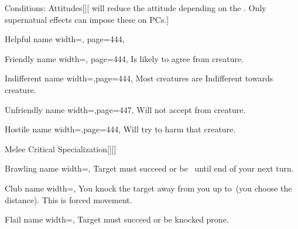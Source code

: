 \begin{PageFront}
\begin{Tables}{\frontTableHeight}
\begin{Table}{Conditions: Attitudes}[][ will reduce the attitude depending on the \GM.
        \quad Only supernatual effects can impose these on PCs.]
\begin{entry}{Helpful}{%
                name width=\conditionLength,%
                page=444,
            }
            \end{entry}
            \begin{entry}{Friendly}{%
                name width=\conditionLength,%
                page=444,
            }
                Is likely to agree  from creature. \hfill
            \end{entry}
            \begin{entry}{Indifferent}{%
                name width=\conditionLength,page=444,}
                Most creatures are Indifferent towards creature.
            \end{entry}
            \begin{entry}{Unfriendly}{%
                name width=\conditionLength,page=447,}
                Will not accept  from creature.
            \end{entry}
            \begin{entry}{Hostile}{%
                name width=\conditionLength,page=444,}
                Will try to harm that creature.
            \end{entry}
        \end{Table}
        \TableSpace
        \begin{Table}{Melee Critical Specialization}[][]
            \begin{entry}{Brawling}{%
                name width=\conditionLength,%
            }
                Target must succeed \Fortitude[][before=Class] or be \Slowed\, until end of your next turn.
            \end{entry}
            \begin{entry}{Club}{%
                name width=\conditionLength,%
            }
                You knock the target away from you up to  \Feet\,(you choose the distance).
                This is forced movement.
            \end{entry}
            \begin{entry}{Flail}{%
                name width=\conditionLength,%
            }
                Target must succeed \Reflex[][before=Class] or be knocked prone.

\end{entry}
\end{Table}
\end{Tables}
\end{PageFront}
